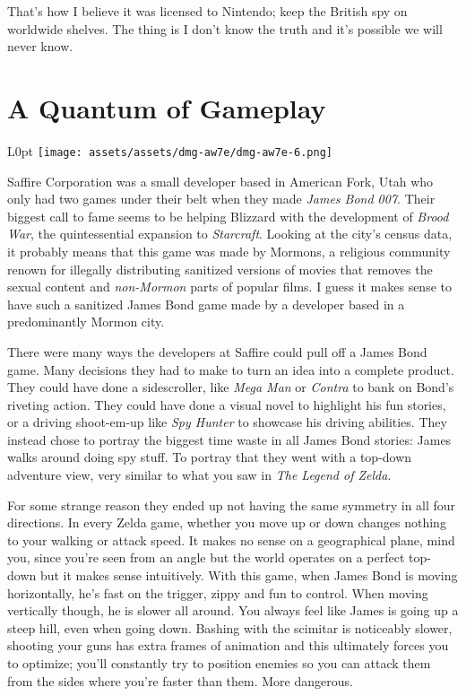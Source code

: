 \documentclass{book}
\begin{document}
That’s how I believe it was licensed to Nintendo; keep the British spy on worldwide shelves. The thing is I don’t know the truth and it’s possible we will never know.

\FloatBarrier\needspace{10mm}\section*{A Quantum of Gameplay}\nopagebreak[4]

\begin{wrapfigure}{L}{0pt} \texttt{[image: assets/assets/dmg-aw7e/dmg-aw7e-6.png]}\end{wrapfigure}
Saffire Corporation was a small developer based in American Fork, Utah who only had two games under their belt when they made \emph{James Bond 007}. Their biggest call to fame seems to be helping Blizzard with the development of \emph{Brood War}, the quintessential expansion to \emph{Starcraft}. Looking at the city’s census data, it probably means that this game was made by Mormons, a religious community renown for illegally distributing sanitized versions of movies that removes the sexual content and \emph{non-Mormon} parts of popular films. I guess it makes sense to have such a sanitized James Bond game made by a developer based in a predominantly Mormon city.

There were many ways the developers at Saffire could pull off a James Bond game. Many decisions they had to make to turn an idea into a complete product. They could have done a sidescroller, like \emph{Mega Man} or \emph{Contra} to bank on Bond’s riveting action. They could have done a visual novel to highlight his fun stories, or a driving shoot-em-up like \emph{Spy Hunter} to showcase his driving abilities. They instead chose to portray the biggest time waste in all James Bond stories: James walks around doing spy stuff. To portray that they went with a top-down adventure view, very similar to what you saw in \emph{The Legend of Zelda}.

For some strange reason they ended up not having the same symmetry in all four directions. In every Zelda game, whether you move up or down changes nothing to your walking or attack speed. It makes no sense on a geographical plane, mind you, since you’re seen from an angle but the world operates on a perfect top-down but it makes sense intuitively. With this game, when James Bond is moving horizontally, he’s fast on the trigger, zippy and fun to control. When moving vertically though, he is slower all around. You always feel like James is going up a steep hill, even when going down. Bashing with the scimitar is noticeably slower, shooting your guns has extra frames of animation and this ultimately forces you to optimize; you’ll constantly try to position enemies so you can attack them from the sides where you’re faster than them. More dangerous.
\end{document}

